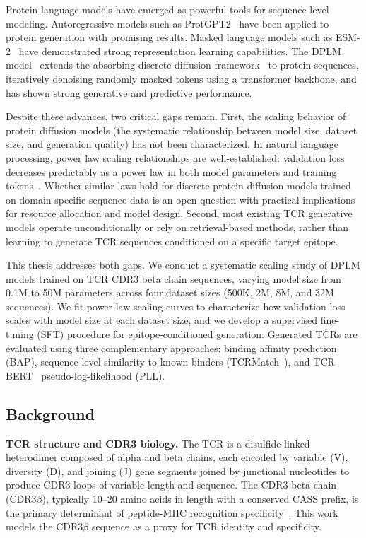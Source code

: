 \documentclass[12pt]{article}
\begin{document}
Protein language models have emerged as powerful tools for sequence-level modeling. Autoregressive
models such as ProtGPT2~\cite{ferruz2022} have been applied to protein generation with promising
results. Masked language models such as ESM-2~\cite{lin2023} have demonstrated strong
representation learning capabilities. The DPLM model~\cite{wang2024dplm} extends the absorbing discrete diffusion
framework~\cite{austin2021} to protein sequences, iteratively denoising randomly masked tokens
using a transformer backbone, and has shown strong generative and predictive performance.

Despite these advances, two critical gaps remain. First, the scaling behavior of protein
diffusion models (the systematic relationship between model size, dataset size, and generation
quality) has not been characterized. In natural language processing, power law scaling
relationships are well-established: validation loss decreases predictably as a power law in
both model parameters and training tokens~\cite{kaplan2020, hoffmann2022}. Whether similar
laws hold for discrete protein diffusion models trained on domain-specific sequence data is
an open question with practical implications for resource allocation and model design. Second,
most existing TCR generative models operate unconditionally or rely on retrieval-based methods,
rather than learning to generate TCR sequences conditioned on a specific target epitope.

This thesis addresses both gaps. We conduct a systematic scaling study of DPLM models trained on
TCR CDR3 beta chain sequences, varying model size from 0.1M to 50M parameters across four
dataset sizes (500K, 2M, 8M, and 32M sequences). We fit power law scaling curves to
characterize how validation loss scales with model size at each dataset size, and we develop
a supervised fine-tuning (SFT) procedure for epitope-conditioned generation. Generated TCRs
are evaluated using three complementary approaches: binding affinity prediction (BAP),
sequence-level similarity to known binders (TCRMatch~\cite{chronister2021}), and
TCR-BERT~\cite{wu2021tcrbert} pseudo-log-likelihood (PLL).

\subsection{Background}

\textbf{TCR structure and CDR3 biology.}
The TCR is a disulfide-linked heterodimer composed of alpha and beta chains, each encoded by
variable (V), diversity (D), and joining (J) gene segments joined by junctional nucleotides
to produce CDR3 loops of variable length and sequence. The CDR3 beta chain (CDR3$\beta$),
typically 10--20 amino acids in length with a conserved CASS prefix, is the primary
determinant of peptide-MHC recognition specificity~\cite{davis1988}. This work models the
CDR3$\beta$ sequence as a proxy for TCR identity and specificity.
\end{document}
